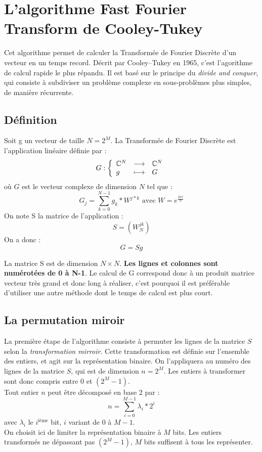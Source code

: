 \documentclass{report}
\begin{document}
	\section{L'algorithme Fast Fourier Transform de Cooley-Tukey}
		Cet algorithme permet de calculer la Transformée de Fourier Discrète d'un vecteur en un temps record. Décrit par Cooley–Tukey en 1965, c'est l'agorithme de calcul rapide le plus répandu. Il est basé sur le principe du \emph{divide and conquer}, qui consiste à subdiviser un problème complexe en sous-problèmes plus simples, de manière récurrente.

		\subsection{Définition}
		Soit g un vecteur de taille $N=2^M$. La Transformée de Fourier Discrète est l'application linéaire définie par :\\
		\[
			G :
			\left \{
			\begin{array}{l l l}
				\mathbb{C}^N			&\longrightarrow& 	\mathbb{C}^N \\
				g 						&\longmapsto&		G
			\end{array} 
			\right. 
		\]
		où $G$ est le vecteur complexe de dimension $N$ tel que :
		\[
			G_j=\sum\limits_{k=0}^{N-1} g_k*W^{j*k} \text{ avec }  W = e^{\frac{2i\pi}{N}}
		\]
		On note S la matrice de l'application : \[S=(W_N^{jk})\]
		On a donc : \[ G=Sg \]
		
		La matrice S est de dimension $N \times N$. \textbf{Les lignes et colonnes sont numérotées de 0 à N-1}. Le calcul de G correspond donc à un produit matrice vecteur très grand et donc long à réaliser, c'est pourquoi il est préférable d'utiliser une autre méthode dont le temps de calcul est plus court.
		
		\subsection{La permutation miroir}
		La première étape de l'algorithme consiste à permuter les lignes de la matrice $S$ selon la \emph{transformation mirroir}. Cette transformation est définie sur l'ensemble des entiers, et agit sur la représentation binaire. On l'appliquera au numéro des lignes de la matrice $S$, qui est de dimension $n = 2^M$. Les entiers à transformer sont donc compris entre $0$ et $(2^M - 1)$.\\
		Tout entier $n$ peut être décomposé en base 2 par :
		\[
			n 	=	\sum_{i=0}^{M-1} \lambda_i * 2^i
		\]
		avec $\lambda_i$ le $i^\text{ième}$ bit, $i$ variant de $0$ à $M-1$.\\
		On choisit ici de limiter la représentation binaire à $M$ bits. Les entiers transformés ne dépassant pas $(2^M - 1)$, $M$ bits suffisent à tous les représenter.
\end{document}
